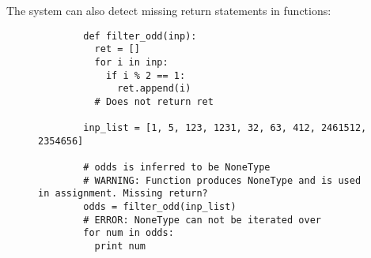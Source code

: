 \documentclass{article}[12pt]
\begin{document}
The system can also detect missing return statements in functions:
\begin{figure}
    \begin{verbatim}
        def filter_odd(inp):
          ret = []
          for i in inp:
            if i % 2 == 1:
              ret.append(i)
          # Does not return ret

        inp_list = [1, 5, 123, 1231, 32, 63, 412, 2461512, 2354656]

        # odds is inferred to be NoneType
        # WARNING: Function produces NoneType and is used in assignment. Missing return?
        odds = filter_odd(inp_list)
        # ERROR: NoneType can not be iterated over
        for num in odds:
          print num
    
    \end{verbatim}
\end{figure}

       
\end{document}
